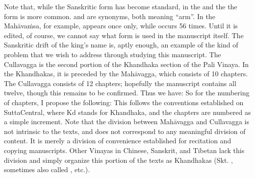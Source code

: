 {}Note that, while the Sanskritic form  has become standard, in the  and the  the form  is more common.  and  are synonyms, both meaning “arm”. In the Mahāvaṁsa, for example,  appears once only, while  occurs 56 times. Until it is edited, of course, we cannot say what form is used in the manuscript itself. The Sanskritic drift of the king’s name is, aptly enough, an example of the kind of problem that we wish to address through studying this manuscript.\markdownRendererInterblockSeparator
{}\markdownRendererInterblockSeparator
{}The Cullavagga is the second portion of the Khandhaka section of the Pali Vinaya. In the Khandhakas, it is preceded by the Mahāvagga, which consists of 10 chapters. The Cullavagga consists of 12 chapters; hopefully the manuscript contains all twelve, though this remains to be confirmed.\markdownRendererInterblockSeparator
{}Thus we have:\markdownRendererInterblockSeparator
{}\markdownRendererInterblockSeparator
{}So for the numbering of chapters, I propose the following:\markdownRendererInterblockSeparator
{}\markdownRendererBlockQuoteBegin
{}
\markdownRendererBlockQuoteEnd \markdownRendererInterblockSeparator
{}This follows the conventions established on SuttaCentral, where Kd stands for Khandhaka, and the chapters are numbered as a simple increment.\markdownRendererInterblockSeparator
{}Note that the division between Mahāvagga and Cullavagga is not intrinsic to the texts, and does not correspond to any meaningful division of content. It is merely a division of convenience established for recitation and copying manuscripts. Other Vinayas in Chinese, Sanskrit, and Tibetan lack this division and simply organize this portion of the texts as Khandhakas (Skt. , sometimes also called , etc.).\markdownRendererInterblockSeparator
